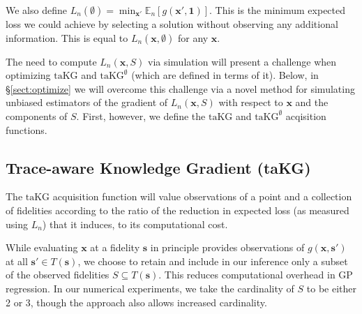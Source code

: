 \documentclass[letterpaper]{article}
\newcommand{\E}{\mathbb{E}}
\let\Section\S
\newcommand{\x}{\mathbf{x}}
\newcommand{\s}{\mathbf{s}}
\newcommand{\T}{T}
\renewcommand{\S}{S}
\newcommand{\one}{\mathbf{1}}
\newcommand{\loss}{L}
\newcommand{\taKG}{\text{taKG}}
\newcommand{\taKGE}{\text{taKG}^\emptyset}
\numberwithin{equation}{section}
\newcommand{\sectn}[1]{\Section\ref{#1}}
\begin{document}
We also define $\loss_n(\emptyset) = \min_{\x'} \E_n\left[g(\x',\one) \right]$.  This is the minimum expected loss we could achieve by selecting a solution without observing any additional information.
This is equal to $\loss_n(\x,\emptyset)$ for any $\x$.

The need to compute $\loss_n(\x,\S)$ via simulation will present a challenge when optimizing $\taKG$ and $\taKGE$ (which are defined in terms of it).  Below, in \sectn{sect:optimize} we will overcome this challenge via a novel method for simulating unbiased estimators of the gradient of $\loss_n(\x,\S)$ with respect to $\x$ and the components of $\S$.  First, however, we define the $\taKG$ and $\taKGE$ acqisition functions.

\subsection{Trace-aware Knowledge Gradient (taKG)}
\label{sect:voi}



The $\taKG$ acquisition function will value observations of a point and a collection of fidelities according to the ratio of the reduction in expected loss (as measured using $\loss_n$) that it induces, to its computational cost.

While evaluating $\x$ at a fidelity $\s$ in principle provides observations of $g(\x,\s')$ at all $\s' \in  \T(\s)$, we choose to retain and include in our inference only a subset of the observed fidelities $\S \subseteq \T(\s)$.  This reduces computational overhead in GP regression.  In our numerical experiments, we take the cardinality of $\S$ to be either 2 or 3, though the approach also allows increased cardinality. 
\end{document}
